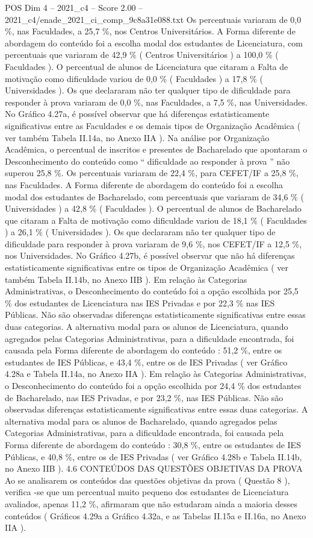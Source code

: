 \begin{textsample}{POS Dim 4 – 2021\_c4 – Score 2.00 – 2021\_c4/enade\_2021\_ci\_comp\_9c8a31e088.txt}
Os percentuais variaram de 0,0 \%, nas Faculdades, a 25,7 \%, nos Centros Universitários.
A Forma diferente de abordagem do conteúdo foi a escolha modal dos estudantes de Licenciatura, com percentuais que variaram de 42,9 \% ( Centros Universitários ) a 100,0 \% ( Faculdades ).
O percentual de alunos de Licenciatura que citaram a Falta de motivação como dificuldade variou de 0,0 \% ( Faculdades ) a 17,8 \% ( Universidades ).
Os que declararam não ter qualquer tipo de dificuldade para responder à prova variaram de 0,0 \%, nas Faculdades, a 7,5 \%, nas Universidades.
No Gráfico 4.27a, é possível observar que há diferenças estatisticamente significativas entre as Faculdades e os demais tipos de Organização Acadêmica ( ver também Tabela II.14a, no Anexo IIA ).
Na análise por Organização Acadêmica, o percentual de inscritos e presentes de Bacharelado que apontaram o Desconhecimento do conteúdo como “ dificuldade ao responder à prova ” não superou 25,8 \%.
Os percentuais variaram de 22,4 \%, para CEFET/IF a 25,8 \%, nas Faculdades.
A Forma diferente de abordagem do conteúdo foi a escolha modal dos estudantes de Bacharelado, com percentuais que variaram de 34,6 \% ( Universidades ) a 42,8 \% ( Faculdades ).
O percentual de alunos de Bacharelado que citaram a Falta de motivação como dificuldade variou de 18,1 \% ( Faculdades ) a 26,1 \% ( Universidades ).
Os que declararam não ter qualquer tipo de dificuldade para responder à prova variaram de 9,6 \%, nos CEFET/IF a 12,5 \%, nos Universidades.
No Gráfico 4.27b, é possível observar que não há diferenças estatisticamente significativas entre os tipos de Organização Acadêmica ( ver também Tabela II.14b, no Anexo IIB ).
Em relação às Categorias Administrativas, o Desconhecimento do conteúdo foi a opção escolhida por 25,5 \% dos estudantes de Licenciatura nas IES Privadas e por 22,3 \% nas IES Públicas.
Não são observadas diferenças estatisticamente significativas entre essas duas categorias.
A alternativa modal para os alunos de Licenciatura, quando agregados pelas Categorias Administrativas, para a dificuldade encontrada, foi causada pela Forma diferente de abordagem do conteúdo : 51,2 \%, entre os estudantes de IES Públicas, e 43,4 \%, entre os de IES Privadas ( ver Gráfico 4.28a e Tabela II.14a, no Anexo IIA ).
Em relação às Categorias Administrativas, o Desconhecimento do conteúdo foi a opção escolhida por 24,4 \% dos estudantes de Bacharelado, nas IES Privadas, e por 23,2 \%, nas IES Públicas.
Não são observadas diferenças estatisticamente significativas entre essas duas categorias.
A alternativa modal para os alunos de Bacharelado, quando agregados pelas Categorias Administrativas, para a dificuldade encontrada, foi causada pela Forma diferente de abordagem do conteúdo : 30,8 \%, entre os estudantes de IES Públicas, e 40,8 \%, entre os de IES Privadas ( ver Gráfico 4.28b e Tabela II.14b, no Anexo IIB ). 4.6 CONTEÚDOS DAS QUESTÕES OBJETIVAS DA PROVA Ao se analisarem os conteúdos das questões objetivas da prova ( Questão 8 ), verifica -se que um percentual muito pequeno dos estudantes de Licenciatura avaliados, apenas 11,2 \%, afirmaram que não estudaram ainda a maioria desses conteúdos ( Gráficos 4.29a a Gráfico 4.32a, e as Tabelas II.15a e II.16a, no Anexo IIA ).

\end{textsample}
